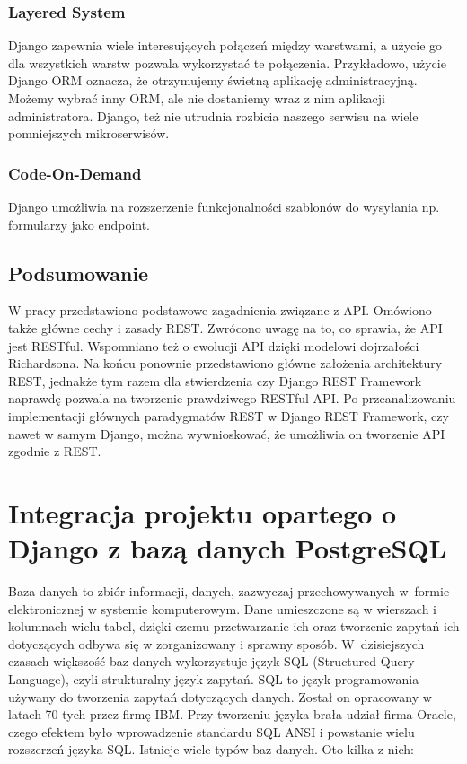 \documentclass[oneside,polski,logo,indent]{amuthesis}
\begin{document}
\newpage
\begin{center}
\subsection{Layered System}
\end{center}
Django zapewnia wiele interesujących połączeń między warstwami, a użycie go dla wszystkich warstw pozwala wykorzystać te połączenia. Przykładowo, użycie Django ORM oznacza, że otrzymujemy świetną aplikację administracyjną. Możemy wybrać inny ORM, ale nie dostaniemy wraz z nim aplikacji administratora. Django, też nie utrudnia rozbicia naszego serwisu na wiele pomniejszych mikroserwisów. 
\begin{center}
\subsection{Code-On-Demand}
\end{center}
Django umożliwia na rozszerzenie funkcjonalności szablonów do wysyłania np. formularzy jako endpoint.
\section{Podsumowanie}
W pracy przedstawiono podstawowe zagadnienia związane z API. Omówiono także główne cechy i zasady REST. Zwrócono uwagę na to, co sprawia, że API jest RESTful. Wspomniano też o ewolucji API dzięki modelowi dojrzałości Richardsona. Na końcu ponownie przedstawiono główne założenia architektury REST, jednakże tym razem dla stwierdzenia czy Django REST Framework naprawdę pozwala na tworzenie prawdziwego RESTful API. Po przeanalizowaniu implementacji głównych paradygmatów REST w Django REST Framework, czy nawet w samym Django, można wywnioskować, że umożliwia on tworzenie API zgodnie z REST.

\chapter{Integracja projektu opartego o Django z bazą danych PostgreSQL}
Baza danych to zbiór informacji, danych, zazwyczaj przechowywanych w~formie elektronicznej w systemie komputerowym.  
Dane umieszczone są w wierszach i kolumnach wielu tabel, dzięki czemu przetwarzanie ich oraz tworzenie zapytań ich dotyczących odbywa się w zorganizowany i sprawny sposób. W~dzisiejszych czasach większość baz danych wykorzystuje język SQL (Structured Query Language), czyli strukturalny język zapytań. 
SQL to język programowania używany do tworzenia zapytań dotyczących danych. Został on opracowany w latach 70-tych przez firmę IBM. Przy tworzeniu języka brała udział firma Oracle, czego efektem było wprowadzenie standardu SQL ANSI i powstanie wielu rozszerzeń języka SQL.  
Istnieje wiele typów baz danych. Oto kilka z nich:  
\end{document}
